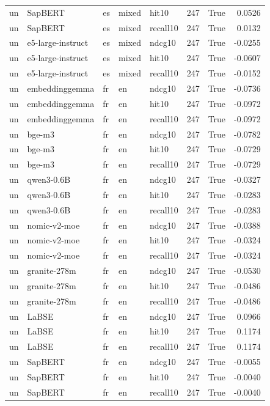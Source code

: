 \begin{tabular}{lllllrrr}
un & SapBERT & es & mixed & hit10 & 247 & True & 0.0526 \\
un & SapBERT & es & mixed & recall10 & 247 & True & 0.0132 \\
un & e5-large-instruct & es & mixed & ndcg10 & 247 & True & -0.0255 \\
un & e5-large-instruct & es & mixed & hit10 & 247 & True & -0.0607 \\
un & e5-large-instruct & es & mixed & recall10 & 247 & True & -0.0152 \\
un & embeddinggemma & fr & en & ndcg10 & 247 & True & -0.0736 \\
un & embeddinggemma & fr & en & hit10 & 247 & True & -0.0972 \\
un & embeddinggemma & fr & en & recall10 & 247 & True & -0.0972 \\
un & bge-m3 & fr & en & ndcg10 & 247 & True & -0.0782 \\
un & bge-m3 & fr & en & hit10 & 247 & True & -0.0729 \\
un & bge-m3 & fr & en & recall10 & 247 & True & -0.0729 \\
un & qwen3-0.6B & fr & en & ndcg10 & 247 & True & -0.0327 \\
un & qwen3-0.6B & fr & en & hit10 & 247 & True & -0.0283 \\
un & qwen3-0.6B & fr & en & recall10 & 247 & True & -0.0283 \\
un & nomic-v2-moe & fr & en & ndcg10 & 247 & True & -0.0388 \\
un & nomic-v2-moe & fr & en & hit10 & 247 & True & -0.0324 \\
un & nomic-v2-moe & fr & en & recall10 & 247 & True & -0.0324 \\
un & granite-278m & fr & en & ndcg10 & 247 & True & -0.0530 \\
un & granite-278m & fr & en & hit10 & 247 & True & -0.0486 \\
un & granite-278m & fr & en & recall10 & 247 & True & -0.0486 \\
un & LaBSE & fr & en & ndcg10 & 247 & True & 0.0966 \\
un & LaBSE & fr & en & hit10 & 247 & True & 0.1174 \\
un & LaBSE & fr & en & recall10 & 247 & True & 0.1174 \\
un & SapBERT & fr & en & ndcg10 & 247 & True & -0.0055 \\
un & SapBERT & fr & en & hit10 & 247 & True & -0.0040 \\
un & SapBERT & fr & en & recall10 & 247 & True & -0.0040 \\

\end{tabular}
